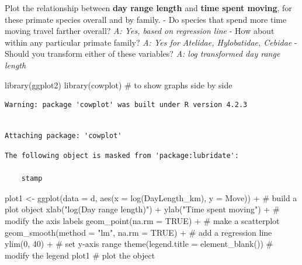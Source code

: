 \documentclass[
  letterpaper,
  DIV=11,
  numbers=noendperiod]{scrartcl}
\newenvironment{Shaded}{\begin{snugshade}}{\end{snugshade}}
\newcommand{\AttributeTok}[1]{\textcolor[rgb]{0.40,0.45,0.13}{#1}}
\newcommand{\CommentTok}[1]{\textcolor[rgb]{0.37,0.37,0.37}{#1}}
\newcommand{\ConstantTok}[1]{\textcolor[rgb]{0.56,0.35,0.01}{#1}}
\newcommand{\DecValTok}[1]{\textcolor[rgb]{0.68,0.00,0.00}{#1}}
\newcommand{\FunctionTok}[1]{\textcolor[rgb]{0.28,0.35,0.67}{#1}}
\newcommand{\NormalTok}[1]{\textcolor[rgb]{0.00,0.23,0.31}{#1}}
\newcommand{\OtherTok}[1]{\textcolor[rgb]{0.00,0.23,0.31}{#1}}
\newcommand{\SpecialCharTok}[1]{\textcolor[rgb]{0.37,0.37,0.37}{#1}}
\newcommand{\StringTok}[1]{\textcolor[rgb]{0.13,0.47,0.30}{#1}}
\begin{document}
Plot the relationship between \textbf{day range length} and \textbf{time
spent moving}, for these primate species overall and by family. - Do
species that spend more time moving travel farther overall? \emph{A:
Yes, based on regression line} - How about within any particular primate
family? \emph{A: Yes for Atelidae, Hylobatidae, Cebidae} - Should you
transform either of these variables? \emph{A: log transformed day range
length}

\begin{Shaded}
\begin{Highlighting}[]
\FunctionTok{library}\NormalTok{(ggplot2)}
\FunctionTok{library}\NormalTok{(cowplot) }\CommentTok{\# to show graphs side by side}
\end{Highlighting}
\end{Shaded}

\begin{verbatim}
Warning: package 'cowplot' was built under R version 4.2.3
\end{verbatim}

\begin{verbatim}

Attaching package: 'cowplot'
\end{verbatim}

\begin{verbatim}
The following object is masked from 'package:lubridate':

    stamp
\end{verbatim}

\begin{Shaded}
\begin{Highlighting}[]
\NormalTok{plot1 }\OtherTok{\textless{}{-}} \FunctionTok{ggplot}\NormalTok{(}\AttributeTok{data =}\NormalTok{ d, }
            \FunctionTok{aes}\NormalTok{(}\AttributeTok{x =} \FunctionTok{log}\NormalTok{(DayLength\_km), }
                \AttributeTok{y =}\NormalTok{ Move)) }\SpecialCharTok{+}  \CommentTok{\# build a plot object}
  \FunctionTok{xlab}\NormalTok{(}\StringTok{"log(Day range length)"}\NormalTok{) }\SpecialCharTok{+} \FunctionTok{ylab}\NormalTok{(}\StringTok{"Time spent moving"}\NormalTok{) }\SpecialCharTok{+} \CommentTok{\# modify the axis labels}
  \FunctionTok{geom\_point}\NormalTok{(}\AttributeTok{na.rm =} \ConstantTok{TRUE}\NormalTok{) }\SpecialCharTok{+} \CommentTok{\# make a scatterplot}
  \FunctionTok{geom\_smooth}\NormalTok{(}\AttributeTok{method =} \StringTok{"lm"}\NormalTok{, }\AttributeTok{na.rm =} \ConstantTok{TRUE}\NormalTok{) }\SpecialCharTok{+} \CommentTok{\# add a regression line}
  \FunctionTok{ylim}\NormalTok{(}\DecValTok{0}\NormalTok{, }\DecValTok{40}\NormalTok{) }\SpecialCharTok{+} \CommentTok{\# set y{-}axis range}
  \FunctionTok{theme}\NormalTok{(}\AttributeTok{legend.title =} \FunctionTok{element\_blank}\NormalTok{()) }\CommentTok{\# modify the legend}
\NormalTok{plot1 }\CommentTok{\# plot the object}
\end{Highlighting}
\end{Shaded}
\end{document}

